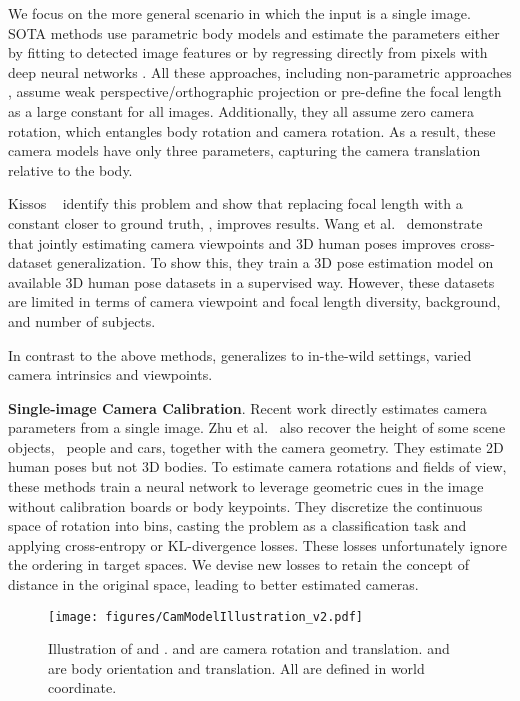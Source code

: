 \documentclass[10pt,twocolumn,letterpaper,usenames,dvipsnames]{article}
\begin{document}
We focus on the more general scenario in which the input is a single image. 
SOTA methods use parametric body models \cite{totalcapture,looper_smpl,SMPL-X:2019,xu2020ghum} 
and estimate the parameters either by fitting to detected image features \cite{bogo_smplify,SMPL-X:2019,xiang2019monocular} or by regressing directly from pixels with deep neural networks \cite{expose2020eccv,guler_2019_CVPR,jiang2020mpshape,joo2020eft,kanazawa_hmr,SPIN:ICCV:2019,Rockwell2020,rong2020frankmocap,song2020human,xu2019denserac,CenterHMR,zanfir2020weakly}.
All these approaches, including non-parametric approaches \cite{kolotouros2019cmr, saito2019pifu, saito2020pifuhd, Zeng_2020_CVPR}, assume weak perspective/orthographic projection or  pre-define the focal length as a large constant for all images. 
Additionally, they all assume zero camera rotation, which entangles body rotation and camera rotation.
As a result, these camera models have only three parameters, capturing the camera translation relative to the body.

Kissos \etal~\cite{kissosECCVW2020} identify this problem and show that replacing focal length with a constant closer to ground truth, \ie , improves results.
Wang et al.~\cite{wang2020viewpoint} demonstrate that jointly estimating camera viewpoints and 3D human poses improves cross-dataset generalization. 
To show this, they train a 3D pose estimation model on available 3D human pose datasets in a supervised way. 
However, these datasets are limited in terms of camera viewpoint and focal length diversity, background, and number of subjects.

In contrast to the above methods, \methodname generalizes to in-the-wild settings, varied camera intrinsics and viewpoints.

\noindent\textbf{Single-image Camera Calibration}.
Recent work \cite{Hold-Geoffroy_2018_CVPR,Kendall_2015_ICCV,workman2016horizon,zhu2020single} directly estimates camera parameters from a single image.
Zhu et al.~\cite{zhu2020single} also recover the height of some scene objects, \eg~people and cars, together with the camera geometry. 
They estimate 2D human poses but not 3D bodies.
To estimate camera rotations and fields of view, these methods train a neural network to leverage geometric cues in the image without calibration boards or body keypoints.
They discretize the continuous space of rotation into bins, casting the problem as a classification task and applying cross-entropy \cite{workman2016horizon} or KL-divergence \cite{Hold-Geoffroy_2018_CVPR,zhu2020single} losses. 
These losses unfortunately ignore the ordering in target spaces.
We devise new losses to retain the concept of distance in the original space, leading to better estimated cameras. 
\begin{figure}[t]
    \centerline{
    \texttt{[image: figures/CamModelIllustration\_v2.pdf]}}
    \vspace{-0.1in}
    \caption{Illustration of \iwcam and \methodname.  and  are camera rotation and translation.  and  are body orientation and translation. All are defined in world coordinate.}
    \label{fig:naive_cam}
    \vspace{-2ex}
\end{figure}{}
\end{document}
